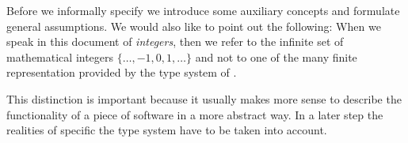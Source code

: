Before we informally specify \bitwalker
we introduce some auxiliary concepts and formulate general assumptions.
We would also like to point out the following:
When we speak in this document of \emph{integers},
then we refer to the infinite set of mathematical
integers $\{\ldots, -1, 0, 1, \ldots\}$
and not to one of the many finite representation provided by the type system of \isoc.

This distinction is important because it usually makes more sense
to describe the functionality of a piece of software in a more
abstract way.
In a later step the realities of specific the \isoc type system
have to be taken into account.

